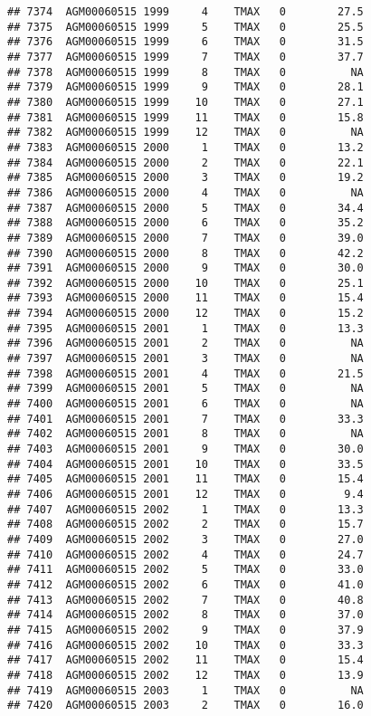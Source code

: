 \documentclass{article}\usepackage[]{graphicx}\usepackage[]{color}
\makeatletter
\newenvironment{kframe}{%
 \def\at@end@of@kframe{}%
 \ifinner\ifhmode%
  \def\at@end@of@kframe{\end{minipage}}%
  \begin{minipage}{\columnwidth}%
 \fi\fi%
 \def\FrameCommand##1{\hskip\@totalleftmargin \hskip-\fboxsep
 \colorbox{shadecolor}{##1}\hskip-\fboxsep
     \hskip-\linewidth \hskip-\@totalleftmargin \hskip\columnwidth}%
 \MakeFramed {\advance\hsize-\width
   \@totalleftmargin\z@ \linewidth\hsize
   \@setminipage}}%
 {\par\unskip\endMakeFramed%
 \at@end@of@kframe}
\newenvironment{knitrout}{}{} %
\makeatother
\begin{document}
\begin{knitrout}
\begin{kframe}
\begin{verbatim}
## 7374  AGM00060515 1999     4    TMAX   0        27.5
## 7375  AGM00060515 1999     5    TMAX   0        25.5
## 7376  AGM00060515 1999     6    TMAX   0        31.5
## 7377  AGM00060515 1999     7    TMAX   0        37.7
## 7378  AGM00060515 1999     8    TMAX   0          NA
## 7379  AGM00060515 1999     9    TMAX   0        28.1
## 7380  AGM00060515 1999    10    TMAX   0        27.1
## 7381  AGM00060515 1999    11    TMAX   0        15.8
## 7382  AGM00060515 1999    12    TMAX   0          NA
## 7383  AGM00060515 2000     1    TMAX   0        13.2
## 7384  AGM00060515 2000     2    TMAX   0        22.1
## 7385  AGM00060515 2000     3    TMAX   0        19.2
## 7386  AGM00060515 2000     4    TMAX   0          NA
## 7387  AGM00060515 2000     5    TMAX   0        34.4
## 7388  AGM00060515 2000     6    TMAX   0        35.2
## 7389  AGM00060515 2000     7    TMAX   0        39.0
## 7390  AGM00060515 2000     8    TMAX   0        42.2
## 7391  AGM00060515 2000     9    TMAX   0        30.0
## 7392  AGM00060515 2000    10    TMAX   0        25.1
## 7393  AGM00060515 2000    11    TMAX   0        15.4
## 7394  AGM00060515 2000    12    TMAX   0        15.2
## 7395  AGM00060515 2001     1    TMAX   0        13.3
## 7396  AGM00060515 2001     2    TMAX   0          NA
## 7397  AGM00060515 2001     3    TMAX   0          NA
## 7398  AGM00060515 2001     4    TMAX   0        21.5
## 7399  AGM00060515 2001     5    TMAX   0          NA
## 7400  AGM00060515 2001     6    TMAX   0          NA
## 7401  AGM00060515 2001     7    TMAX   0        33.3
## 7402  AGM00060515 2001     8    TMAX   0          NA
## 7403  AGM00060515 2001     9    TMAX   0        30.0
## 7404  AGM00060515 2001    10    TMAX   0        33.5
## 7405  AGM00060515 2001    11    TMAX   0        15.4
## 7406  AGM00060515 2001    12    TMAX   0         9.4
## 7407  AGM00060515 2002     1    TMAX   0        13.3
## 7408  AGM00060515 2002     2    TMAX   0        15.7
## 7409  AGM00060515 2002     3    TMAX   0        27.0
## 7410  AGM00060515 2002     4    TMAX   0        24.7
## 7411  AGM00060515 2002     5    TMAX   0        33.0
## 7412  AGM00060515 2002     6    TMAX   0        41.0
## 7413  AGM00060515 2002     7    TMAX   0        40.8
## 7414  AGM00060515 2002     8    TMAX   0        37.0
## 7415  AGM00060515 2002     9    TMAX   0        37.9
## 7416  AGM00060515 2002    10    TMAX   0        33.3
## 7417  AGM00060515 2002    11    TMAX   0        15.4
## 7418  AGM00060515 2002    12    TMAX   0        13.9
## 7419  AGM00060515 2003     1    TMAX   0          NA
## 7420  AGM00060515 2003     2    TMAX   0        16.0

\end{verbatim}
\end{kframe}
\end{knitrout}
\end{document}

